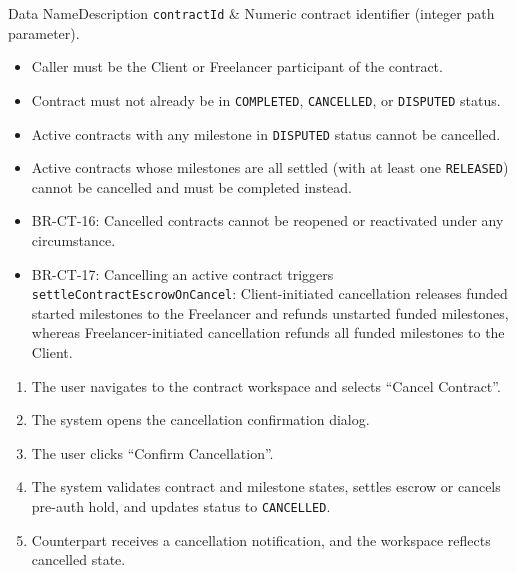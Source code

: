 
\begin{specdatatable}{Data Name}{Description}
      \texttt{contractId} & Numeric contract identifier (integer path parameter).\\ \hline
\end{specdatatable}

\begin{itemize}[leftmargin=1.6em,topsep=3pt,itemsep=2pt,parsep=0pt,label=$\bullet$]
      \item Caller must be the Client or Freelancer participant of the contract.
      \item Contract must not already be in \texttt{COMPLETED}, \texttt{CANCELLED}, or \texttt{DISPUTED} status.
      \item Active contracts with any milestone in \texttt{DISPUTED} status cannot be cancelled.
      \item Active contracts whose milestones are all settled (with at least one \texttt{RELEASED}) cannot be cancelled and must be completed instead.
\end{itemize}

\begin{itemize}[leftmargin=1.6em,topsep=3pt,itemsep=2pt,parsep=0pt,label=$\bullet$]\brrulelist
      \item BR-CT-16: Cancelled contracts cannot be reopened or reactivated under any circumstance.
      \item BR-CT-17: Cancelling an active contract triggers \texttt{settleContractEscrowOnCancel}: Client-initiated cancellation releases funded started milestones to the Freelancer and refunds unstarted funded milestones, whereas Freelancer-initiated cancellation refunds all funded milestones to the Client.
\end{itemize}

\begin{enumerate}[leftmargin=1.8em,topsep=3pt,itemsep=2pt,parsep=0pt]
      \item The user navigates to the contract workspace and selects ``Cancel Contract''.
      \item The system opens the cancellation confirmation dialog.
      \item The user clicks ``Confirm Cancellation''.
      \item The system validates contract and milestone states, settles escrow or cancels pre-auth hold, and updates status to \texttt{CANCELLED}.
      \item Counterpart receives a cancellation notification, and the workspace reflects cancelled state.
\end{enumerate}

